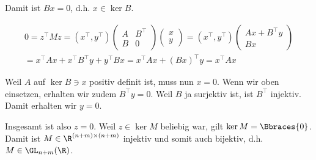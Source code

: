 \begin{solution}
\begin{enumerate}[label = \textbf{\alph*)}]
\begin{itemize}
    Damit ist $B x = 0$, d.h. $x \in \ker B$.

    \begin{multline*}
      0 =
      z^\top M z
      =
      (x^\top, y^\top)
      \begin{pmatrix}
        A & B^\top \\
        B & 0
      \end{pmatrix}
      \begin{pmatrix}
        x \\ y
      \end{pmatrix}
      =
      (x^\top, y^\top)
      \begin{pmatrix}
        A x + B^\top y \\
        B x
      \end{pmatrix} \\
      =
      x^\top A x + x^\top B^\top y + y^\top B x
      =
      x^\top A x + (B x)^\top y
      =
      x^\top A x
    \end{multline*}

    Weil $A$ auf $\ker B \ni x$ positiv definit ist, muss nun $x = 0$.
    Wenn wir oben einsetzen, erhalten wir zudem $B^\top y = 0$.
    Weil $B$ ja surjektiv ist, ist $B^\top$ injektiv.
    Damit erhalten wir $y = 0$.

    Insgesamt ist also $z = 0$.
    Weil $z \in \ker M$ beliebig war, gilt $\ker M = \Bbraces{0}$.
    Damit ist $M \in \R^{(n+m) \times (n+m)}$ injektiv und somit auch bijektiv, d.h. $M \in \GL_{n + m}(\R)$.

  \end{itemize}

\end{enumerate}

\end{solution}

